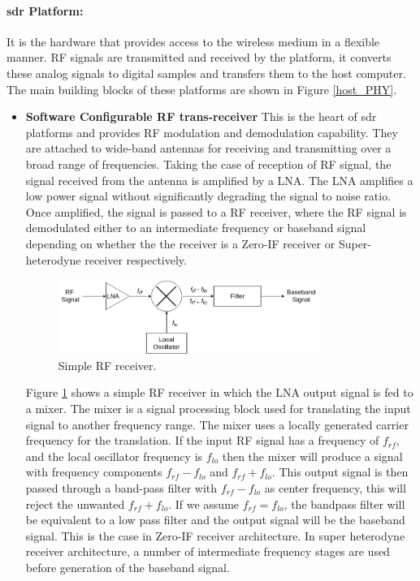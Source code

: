 \paragraph{\ac{sdr} Platform:} It is the hardware that provides access to the wireless medium in a flexible manner.
\ac{RF} signals are transmitted and received by the platform, it converts these analog signals to digital samples and transfers them to the host computer.
The main building blocks of these platforms are shown in Figure \ref{host_PHY}.
\begin{itemize}
\item{\textbf{Software Configurable \ac{RF} trans-receiver}}  This is the heart of \ac{sdr} platforms and provides \ac{RF} modulation and demodulation capability.
They are attached to wide-band antennas for receiving and transmitting over a broad range of frequencies.
Taking the case of reception of RF signal, the signal received from the antenna is amplified by a \ac{LNA}.
The \ac{LNA} amplifies a low power signal without significantly degrading the signal to noise ratio.
Once amplified, the signal is passed to a \ac{RF} receiver, where the \ac{RF} signal is demodulated either to an intermediate frequency or baseband signal depending on whether the the receiver is a Zero-IF receiver or Super-heterodyne receiver respectively.\\

\begin{figure}[h!]
\centering
\includegraphics[width=0.8\textwidth]{Figure/RF_receiver.png}
\caption{Simple \ac{RF} receiver.}
\label{rf_receiver}
\end{figure}

Figure \ref{rf_receiver} shows a simple \ac{RF} receiver in which the \ac{LNA} output signal is fed to a mixer.
The mixer is a signal processing block used for translating the input signal to another frequency range.
The mixer uses a locally generated carrier frequency for the translation. 
If the input \ac{RF} signal has a frequency of $f_{rf}$, and the local oscillator frequency is $f_{lo}$ then the mixer will produce a signal with frequency components $f_{rf}-f_{lo}$ and $f_{rf}+f_{lo}$.
This output signal is then passed through a band-pass filter with $f_{rf}-f_{lo}$ as center frequency, this will reject the unwanted $f_{rf}+f_{lo}$.
If we assume $f_{rf}=f_{lo}$, the bandpass filter will be equivalent to a low pass filter and the output signal will be the baseband signal.
This is the case in Zero-IF receiver architecture.
In super heterodyne receiver architecture, a number of intermediate frequency stages are used before generation of the baseband signal.\\


\end{itemize}
